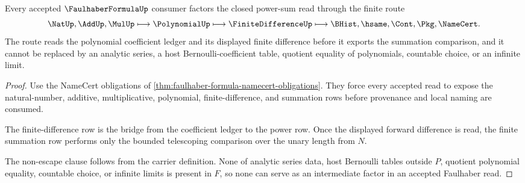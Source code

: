 \begin{theorem}
\label{thm:faulhaber-formula-finite-difference-route}
Every accepted $\FaulhaberFormulaUp$ consumer factors the closed power-sum read through the finite route
$$
\NatUp,\AddUp,\MulUp
\longmapsto
\PolynomialUp
\longmapsto
\FiniteDifferenceUp
\longmapsto
\BHist,\hsame,\Cont,\Pkg,\NameCert .
$$
The route reads the polynomial coefficient ledger and its displayed finite difference before it exports the summation comparison, and it cannot be replaced by an analytic series, a host Bernoulli-coefficient table, quotient equality of polynomials, countable choice, or an infinite limit.
\end{theorem}
\begin{proof}
Use the NameCert obligations of \autoref{thm:faulhaber-formula-namecert-obligations}. They force every accepted read to expose the natural-number, additive, multiplicative, polynomial, finite-difference, and summation rows before provenance and local naming are consumed.

The finite-difference row is the bridge from the coefficient ledger to the power row. Once the displayed forward difference is read, the finite summation row performs only the bounded telescoping comparison over the unary length from $N$.

The non-escape clause follows from the carrier definition. None of analytic series data, host Bernoulli tables outside $P$, quotient polynomial equality, countable choice, or infinite limits is present in $F$, so none can serve as an intermediate factor in an accepted Faulhaber read.
\end{proof}




